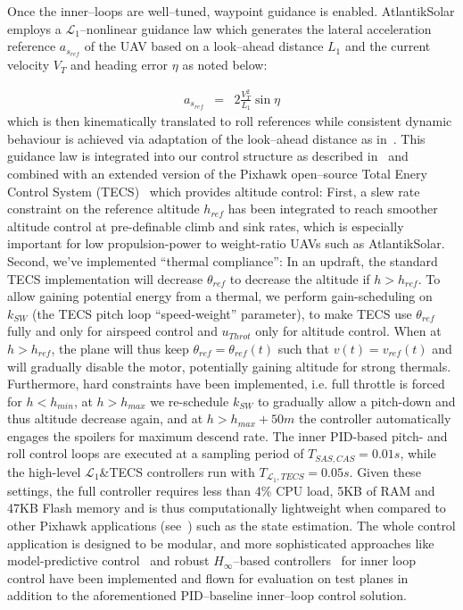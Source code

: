 Once the inner--loops are well--tuned, waypoint guidance is enabled. AtlantikSolar employs a $\mathcal{L}_1$--nonlinear guidance law which generates the lateral acceleration reference $a_{s_{ref}}$ of the UAV based on a look--ahead distance ${L}_1$ and the current velocity $V_T$ and heading error $\eta$ as noted below:

\small
\begin{eqnarray}
 a_{s_{ref}} &=& 2\frac{V_T^2}{L_1}\sin \eta
\end{eqnarray}
\normalsize
which is then kinematically translated to roll references while consistent dynamic behaviour is achieved via adaptation of the look--ahead distance as in~\cite{L1stabAnalysis}. This guidance law is integrated into our control structure as described in~\cite{OMLAS_MED_14} and combined with an extended version of the Pixhawk open--source Total Enery Control System (TECS)~\cite{PixhawkWebsite} which provides altitude control: First, a slew rate constraint on the reference altitude $h_{ref}$ has been integrated to reach smoother altitude control at pre-definable climb and sink rates, which is especially important for low propulsion-power to weight-ratio UAVs such as AtlantikSolar. Second, we've implemented ``thermal compliance'': In an updraft, the standard TECS implementation will decrease $\theta_{ref}$ to decrease the altitude if $h>h_{ref}$. To allow gaining potential energy from a thermal, we perform gain-scheduling on $k_{SW}$ (the TECS pitch loop ``speed-weight'' parameter), to make TECS use $\theta_{ref}$ fully and only for airspeed control and $u_{Throt}$ only for altitude control. When at $h>h_{ref}$, the plane will thus keep $\theta_{ref}=\theta_{ref}(t)$  such that $v(t)=v_{ref}(t)$ and will gradually disable the motor, potentially gaining altitude for strong thermals. Furthermore, hard constraints have been implemented, i.e. full throttle is forced for $h<h_{min}$, at $h>h_{max}$ we re-schedule $k_{SW}$ to gradually allow a pitch-down and thus altitude decrease again, and at $h>h_{max}+50m$ the controller automatically engages the spoilers for maximum descend rate. The inner PID-based pitch- and roll control loops are executed at a sampling period of $T_{SAS,CAS}=0.01s$, while the high-level $\mathcal{L}_1$\&TECS controllers run with $T_{\mathcal{L}_1,TECS}=0.05s$. Given these settings, the full controller requires less than 4\% CPU load, 5KB of RAM and 47KB Flash memory and is thus computationally lightweight when compared to other Pixhawk applications (see~\cite{OMLAS_MED_14}) such as the state estimation. The whole control application is designed to be modular, and more sophisticated approaches like model-predictive control~\cite{OMLAS_MED_14} and robust $H_\infty$--based controllers~\cite{Mosimann_FT} for inner loop control have been implemented and flown for evaluation on test planes in addition to the aforementioned PID--baseline inner--loop control solution. 